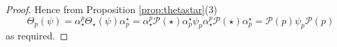 \documentclass[10pt,a4paper]{amsart}
\newcommand{\calP}{\mathcal P}
\begin{document}
\begin{proof}
Hence from Proposition \ref{prop:thetastar}(3)
\[\Theta_p(\psi) = \alpha_{\star}^p \Theta_{\star}(\psi) \alpha_p^{\star} = \alpha_{\star}^p \calP(\star) \alpha_p^{\star} \psi_p \alpha_{\star}^p \calP(\star)  \alpha_p^{\star} = \calP(p)\psi_p \calP(p)\]
as required.
\end{proof}
\end{document}
